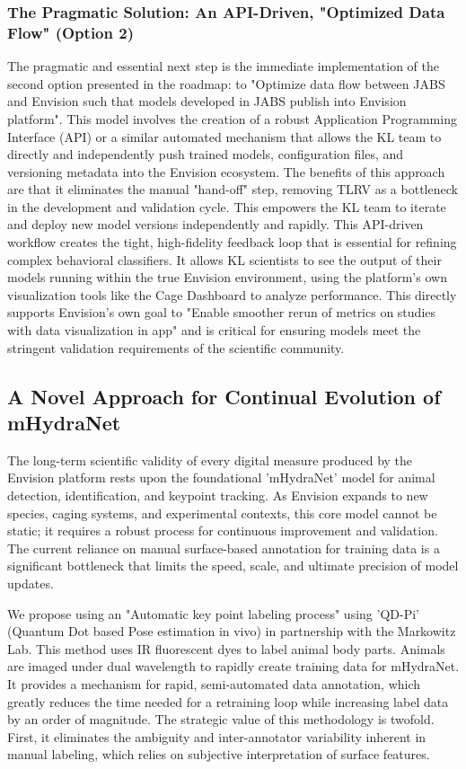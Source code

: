 \documentclass[11pt,onecolumn]{article}
\begin{document}
\subsubsection{The Pragmatic Solution: An API-Driven, "Optimized Data Flow" (Option 2)}

The pragmatic and essential next step is the immediate implementation of the second option presented in the roadmap: to "Optimize data flow between JABS and Envision such that models developed in JABS publish into Envision platform". This model involves the creation of a robust Application Programming Interface (API) or a similar automated mechanism that allows the KL team to directly and independently push trained models, configuration files, and versioning metadata into the Envision ecosystem. The benefits of this approach are that it eliminates the manual "hand-off" step, removing TLRV as a bottleneck in the development and validation cycle. This empowers the KL team to iterate and deploy new model versions independently and rapidly. This API-driven workflow creates the tight, high-fidelity feedback loop that is essential for refining complex behavioral classifiers. It allows KL scientists to see the output of their models running within the true Envision environment, using the platform's own visualization tools like the Cage Dashboard to analyze performance. This directly supports Envision's own goal to "Enable smoother rerun of metrics on studies with data visualization in app" and is critical for ensuring models meet the stringent validation requirements of the scientific community.

\subsection{A Novel Approach for Continual Evolution of mHydraNet}

The long-term scientific validity of every digital measure produced by the Envision platform rests upon the foundational 'mHydraNet' model for animal detection, identification, and keypoint tracking. As Envision expands to new species, caging systems, and experimental contexts, this core model cannot be static; it requires a robust process for continuous improvement and validation. The current reliance on manual surface-based annotation for training data is a significant bottleneck that limits the speed, scale, and ultimate precision of model updates.

We propose using an "Automatic key point labeling process" using 'QD-Pi' (Quantum Dot based Pose estimation in vivo) in partnership with the Markowitz Lab. This method uses IR fluorescent dyes to label animal body parts. Animals are imaged under dual wavelength to rapidly create training data for mHydraNet. It provides a mechanism for rapid, semi-automated data annotation, which greatly reduces the time needed for a retraining loop while increasing label data by an order of magnitude. The strategic value of this methodology is twofold. First, it eliminates the ambiguity and inter-annotator variability inherent in manual labeling, which relies on subjective interpretation of surface features.
\end{document}
